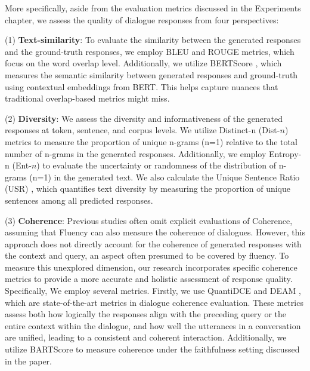 \documentclass[letterpaper]{article} %
\begin{document}
More specifically, aside from the evaluation metrics discussed in the Experiments chapter, we assess the quality of dialogue responses from four perspectives: 

(1) \textbf{Text-similarity}: To evaluate the similarity between the generated responses and the ground-truth responses, we employ BLEU \cite{papineni-etal-2002-bleu} and ROUGE \cite{lin-2004-rouge} metrics, which focus on the word overlap level. Additionally, we utilize BERTScore \cite{zhang-etal-2020-bert-score}, which measures the semantic similarity between generated responses and ground-truth using contextual embeddings from BERT. This helps capture nuances that traditional overlap-based metrics might miss.

(2) \textbf{Diversity}: We assess the diversity and informativeness of the generated responses at token, sentence, and corpus levels. We utilize Distinct-n (Dist-$n$) metrics \cite{li-etal-2016-diversity} to measure the proportion of unique n-grams (n=1) relative to the total number of n-grams in the generated responses. Additionally, we employ Entropy-n (Ent-$n$) \cite{zhang-etal-2018-generating} to evaluate the uncertainty or randomness of the distribution of n-grams (n=1) in the generated text. We also calculate the Unique Sentence Ratio (USR) \cite{li-etal-2020-generate}, which quantifies text diversity by measuring the proportion of unique sentences among all predicted responses.

(3) \textbf{Coherence}: Previous studies often omit explicit evaluations of Coherence, assuming that Fluency can also measure the coherence of dialogues. However, this approach does not directly account for the coherence of generated responses with the context and query, an aspect often presumed to be covered by fluency. To measure this unexplored dimension, our research incorporates specific coherence metrics to provide a more accurate and holistic assessment of response quality. Specifically, We employ several metrics. Firstly, we use QuantiDCE \cite{ye-etal-2021-towards-quantifiable} and DEAM \cite{ghazarian-etal-2022-deam}, which are state-of-the-art metrics in dialogue coherence evaluation. These metrics assess both how logically the responses align with the preceding query or the entire context within the dialogue, and how well the utterances in a conversation are unified, leading to a consistent and coherent interaction. Additionally, we utilize BARTScore \cite{yuan-etal-2021-bartscore} to measure coherence under the faithfulness setting discussed in the paper.
\end{document}
